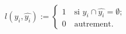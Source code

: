 \begin{gather}
l(y_i, \widehat{y_i}):=\left\{
                          \begin{array}{ll}
                            1 \quad\text{si } y_i \cap \widehat{y_i}=\emptyset; \\
                            0 \quad\text{autrement}.
                          \end{array}
                        \right.
\end{gather}


